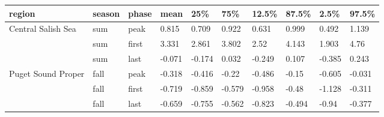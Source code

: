 \documentclass{article}
\begin{document}
\begin{adjustwidth}{-4cm}{-2cm}
\begin{table}[ht]
\label{tab:salmtren}
\begingroup\tiny
\begin{tabular}{|p{}|p{}p{}p{}p{}p{}p{}p{}p{}p{}|}
  \hline
region & season & phase & mean & 25\% & 75\% & 12.5\% & 87.5\% & 2.5\% & 97.5\% \\ 
  \hline
Central Salish Sea & sum & peak & 0.815 & 0.709 & 0.922 & 0.631 & 0.999 & 0.492 & 1.139 \\ 
   & sum & first & 3.331 & 2.861 & 3.802 & 2.52 & 4.143 & 1.903 & 4.76 \\ 
   & sum & last & -0.071 & -0.174 & 0.032 & -0.249 & 0.107 & -0.385 & 0.243 \\ 
   \hline
Puget Sound Proper & fall & peak & -0.318 & -0.416 & -0.22 & -0.486 & -0.15 & -0.605 & -0.031 \\ 
   & fall & first & -0.719 & -0.859 & -0.579 & -0.958 & -0.48 & -1.128 & -0.311 \\ 
   & fall & last & -0.659 & -0.755 & -0.562 & -0.823 & -0.494 & -0.94 & -0.377 \\ 
   \hline
\end{tabular}
\endgroup
\end{table}
\vspace*{\floatsep}


\end{adjustwidth}
\end{document}
